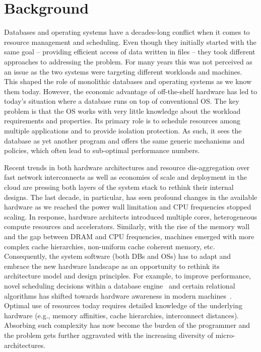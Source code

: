 \documentclass[11pt]{article}
\begin{document}
%

\section{Background}

Databases and operating systems have a decades-long conflict when it comes to resource management and 
scheduling. Even though they initially started with the same goal -- providing efficient access 
of data written in files -- they took different approaches to addressing the problem. For many 
years this was not perceived as an issue as the two systems were targeting different 
workloads and machines. This shaped the role of monolithic databases and operating systems
as we know them today. 
However, the economic advantage of off-the-shelf hardware has led to today's situation where a 
database runs on top of conventional OS. The key problem is that the OS works with very little 
knowledge about the workload requirements and properties. Its primary role is to schedule 
resources among multiple applications and to provide isolation protection. As such, it sees the 
database as yet another program and offers the same generic mechanisms and policies, which often
lead to sub-optimal performance numbers.

Recent trends in both hardware architectures and resource dis-aggregation over fast network 
interconnects as well as economies of scale and deployment in the cloud are pressing both 
layers of the system stack to rethink their internal designs. The last decade, in particular, 
has seen profound changes in the available hardware as we reached the power wall limitation
and CPU frequencies stopped scaling. In response, hardware architects introduced multiple 
cores, heterogeneous compute resources and accelerators. Similarly, with the rise of the 
memory wall and the gap between DRAM and CPU frequencies, machines emerged with more 
complex cache hierarchies, non-uniform cache coherent memory, etc. Consequently, the 
system software (both DBs and OSs) has to adapt and embrace the new hardware landscape 
as an opportunity to rethink its architecture model and design principles.
For example, to improve performance, novel scheduling decisions within a database
engine~\cite{Leis:sigmod14,Porobic:icde14} and certain relational algorithms has 
shifted towards hardware awareness in modern machines~\cite{Polychroniou:2014,balkesen:15,wassenberg2011,muller:16}. 
Optimal use of resources today requires detailed knowledge of the underlying hardware 
(e.g., memory affinities, cache hierarchies, interconnect distances). 
Absorbing such complexity has now become the burden of the programmer and the 
problem gets further aggravated with the increasing diversity of micro-architectures. 
\end{document}
